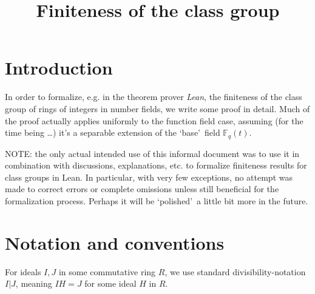 \documentclass{amsart}
\newcommand{\N}{\mathbb{N}}
\newcommand{\Fq}{\mathbb{F}_q}
\begin{document}
\newtheorem{theorem}{Theorem}[section]
\newtheorem{lemma}[theorem]{Lemma}
\newtheorem{proposition}[theorem]{Proposition}
\newtheorem{algorithm}[theorem]{Algorithm}
\newtheorem{corollary}[theorem]{Corollary}
\newtheorem*{conjecture}{Conjecture}

\theoremstyle{definition}
\newtheorem{definition}[theorem]{Definition}
\newtheorem{example}[theorem]{Example}

\theoremstyle{remark}
\newtheorem{remark}[theorem]{Remark}


\title{Finiteness of the class group}

\maketitle

\section{Introduction}\label{intro}

In order to formalize, e.g. in the theorem prover \emph{Lean}, the finiteness of the class group of rings of integers in number fields, we write some proof in detail. Much of the proof actually applies uniformly to the function field case, assuming (for the time being \ldots) it's a separable extension of the \lq base\rq\ field $\Fq(t)$.

NOTE: the only actual intended use of this informal document was to use it in combination with discussions, explanations, etc. to formalize finiteness results for class groups in Lean. In particular, with very few exceptions, no attempt was made to correct errors or complete omissions unless still beneficial for the formalization process.
Perhaps it will be \lq polished\rq\ a little bit more in the future.


\section{Notation and conventions}\label{notation}


For ideals $I,J$ in some commutative ring $R$, we use standard divisibility-notation $I|J$, meaning $IH=J$ for some ideal $H$ in $R$.



\end{document}
